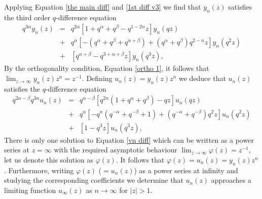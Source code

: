 \documentclass[a4paper,reqno]{amsart}
\numberwithin{equation}{section}
\numberwithin{figure}{section}
\begin{document}
Applying Equation \eqref{the main diff} and \eqref{1st diff v3} we find that $y_n(z)$ satisfies the third order $q$-difference equation
\begin{eqnarray}
q^{3\alpha}y_n(z) &=& q^{2\alpha}\left[ 1+q^\alpha + q^\beta-q^{1-2n}z\right]y_n(qz) \nonumber \\
&+& q^{\alpha}\left[-(q^\alpha + q^\beta + q^{\alpha+\beta}) + (q^\alpha+q^\beta)q^{2-n}z\right]y_n(q^2z) \nonumber \\
&+& \left[ q^{\alpha+\beta}-q^{3+\alpha+\beta}z\right]y_n(q^3z), 
\end{eqnarray}
By the orthogonality condition, Equation \eqref{ortho 1}, it follows that $\lim_{z\to\infty} y_n(z)z^{n} = z^{-1}$. Defining $u_n(z) = y_n(z)z^{n}$ we deduce that $u_n(z)$ satisfies the $q$-difference equation
\begin{eqnarray}
q^{2\alpha-\beta}q^{3n}u_n(z) &=& q^{\alpha-\beta}\left[ q^{2n}(1+q^{\alpha} + q^{\beta})-qz\right]u_n(qz) \nonumber \\
&+& q^{\alpha}\left[-q^{n}(q^{-\alpha} + q^{-\beta} + 1) + (q^{-\alpha}+q^{-\beta})q^{2}z\right]u_n(q^2z) \nonumber \\
&+& \left[ 1-q^{3}z\right]u_n(q^3z), \label{vn diff}
\end{eqnarray}
There is only one solution to Equation \eqref{vn diff} which can be written as a power series at $z=\infty$ with the required asymptotic behaviour $\lim_{z\to\infty} \varphi(z) = z^{-1}$, let us denote this solution as $\varphi(z)$. It follows that $\varphi(z) = u_n(z) = y_n(z)z^{n}$. Furthermore, writing $\varphi(z)$ ($=u_n(z)$) as a power series at infinity and studying the corresponding coefficients we determine that $u_n(z)$ approaches a limiting function $u_\infty(z)$ as $n\to\infty$ for $|z|>1$. \\
\end{document}
